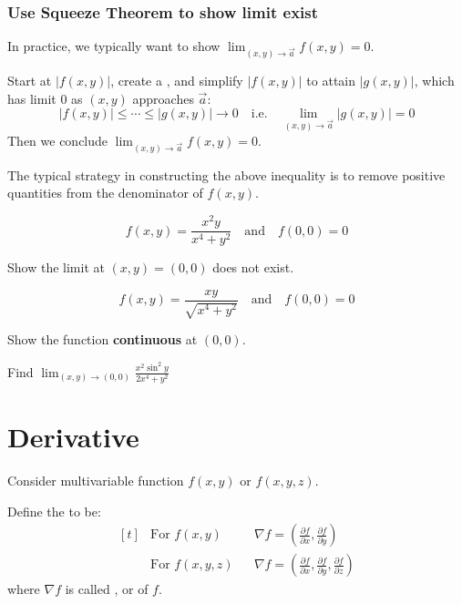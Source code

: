 \documentclass[11pt,fleqn]{book} %
\begin{document}
\subsubsection{Use Squeeze Theorem to show limit exist}

In practice, we typically want to show $\lim_{(x, y) \to \vec{a}} f(x, y) = 0$.

Start at $| f(x, y) |$, create a , and simplify $| f(x, y) |$ to attain $| g(x, y) |$, which has limit $0$ as $(x, y)$ approaches $\vec{a}$: $$|f(x, y)| \le \cdots \le | g(x, y) | \to 0 \quad\text{i.e.}\quad \lim_{(x, y) \to \vec{a}} | g(x, y) | = 0$$ Then we conclude $\lim_{(x, y) \to \vec{a}} f(x, y) = 0$.

The typical strategy in constructing the above inequality is to remove positive quantities from the denominator of $f(x, y)$.

\begin{exercise}
    $$f(x, y) = \frac{x^2y}{x^4 + y^2} \quad\text{and}\quad f(0, 0) = 0$$

    Show the limit at $(x, y) = (0, 0)$ does not exist.
\end{exercise}

\begin{exercise}
    $$f(x, y) = \frac{xy}{\sqrt{x^4 + y^2}} \quad\text{and}\quad f(0, 0) = 0$$

    Show the function \textbf{continuous} at $(0, 0)$.
\end{exercise}

\begin{exercise}
    Find $\lim_{(x, y) \to (0, 0)} \frac{x^2 \sin^2{y}}{2x^4 + y^2}$
\end{exercise}

\section{Derivative}

Consider multivariable function $f(x, y)$ or $f(x, y, z)$.

Define the  to be:
$$\begin{aligned}[t]
    & \text{For } f(x, y)    &  & \nabla f = \left( \frac{\partial f}{\partial x}, \frac{\partial f}{\partial y} \right)                                \\
    & \text{For } f(x, y, z) &  & \nabla f = \left( \frac{\partial f}{\partial x}, \frac{\partial f}{\partial y}, \frac{\partial f}{\partial z} \right)
\end{aligned}$$
where $\nabla f$ is called , or  of $f$.
\end{document}
